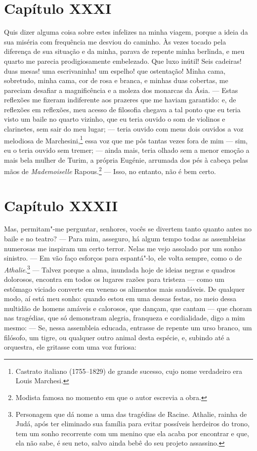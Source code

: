 \section*{Capítulo XXXI}

 Quis dizer alguma coisa sobre estes infelizes na minha viagem, porque a
ideia da sua miséria com frequência me desviou do caminho. Às vezes
tocado pela diferença de sua situação e da minha, parava de repente
minha berlinda, e meu quarto me parecia prodigiosamente embelezado. Que
luxo inútil! Seis cadeiras! duas mesas! uma escrivaninha! um espelho!
que ostentação! Minha cama, sobretudo, minha cama, cor de rosa e
branca, e minhas duas cobertas, me pareciam desafiar a magnificência e
a moleza dos monarcas da Ásia. --- Estas reflexões me fizeram
indiferente aos prazeres que me haviam garantido: e, de reflexões em
reflexões, meu acesso de filosofia chegava a tal ponto que eu teria
visto um baile no quarto vizinho, que eu teria ouvido o som de violinos
e clarinetes, sem sair do meu lugar; --- teria ouvido com meus dois
ouvidos a voz melodiosa de Marchesini,\footnote{ Castrato italiano
(1755--1829) de grande sucesso, cujo nome verdadeiro era Louis Marchesi.}
essa voz que me pôs tantas vezes fora de mim --- sim, eu o
teria ouvido sem tremer; --- ainda mais, teria olhado sem a menor
emoção a mais bela mulher de Turim, a própria Eugénie, arrumada dos pés
à cabeça pelas mãos de \textit{Mademoiselle} Rapous.\footnote{ Modista
famosa no momento em que o autor escrevia a obra.} --- Isso, no
entanto, não é bem certo. 

\section*{Capítulo XXXII}

 Mas, permitam"-me perguntar, senhores, vocês se divertem tanto quanto
antes no baile e no teatro? --- Para mim, asseguro, há algum tempo
todas as assembleias numerosas me inspiram um certo terror. Nelas me
vejo assolado por um sonho sinistro. --- Em vão faço esforços para
espantá"-lo, ele volta sempre, como o de \textit{Athalie}.\footnote{
Personagem que dá nome a uma das tragédias de Racine. Athalie, rainha
de Judá, após ter eliminado sua família para evitar possíveis herdeiros
do trono, tem um sonho recorrente com um menino que ela acaba por
encontrar e que, ela não sabe, é seu neto, salvo ainda bebê do seu
projeto assassino.} --- Talvez porque a alma, inundada hoje de
ideias negras e quadros dolorosos, encontra em todos os lugares razões
para tristeza --- como um estômago viciado converte em veneno os
alimentos mais saudáveis. De qualquer modo, aí está meu sonho: quando
estou em uma dessas festas, no meio dessa multidão de homens amáveis e
calorosos, que dançam, que cantam --- que choram nas tragédias, que só
demonstram alegria, franqueza e cordialidade, digo a mim mesmo: --- Se,
nessa assembleia educada, entrasse de repente um urso branco, um
filósofo, um tigre, ou qualquer outro animal desta espécie, e, subindo
até a orquestra, ele gritasse com uma voz furiosa:

